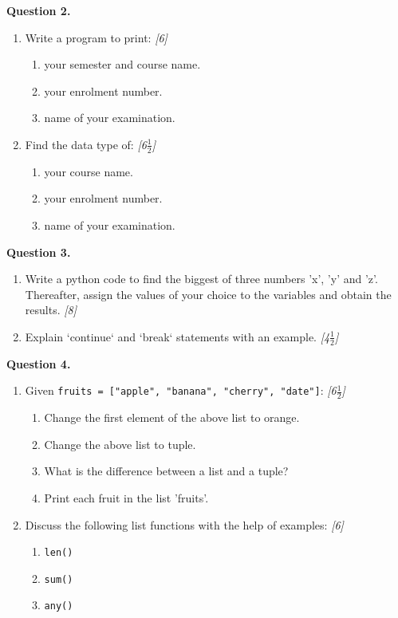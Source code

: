 \documentclass[11pt,a4paper]{article}
\newcommand{\pts}[1]{\hfill \textit{[#1]}}
\begin{document}
\noindent \textbf{Question 2.}
\begin{enumerate}[label=(\alph*)]
  \item Write a program to print: \pts{6}
  \begin{enumerate}[label=(\roman*)]
    \item your semester and course name.
    \item your enrolment number.
    \item name of your examination.
  \end{enumerate}
  \item Find the data type of: \pts{6$\frac{1}{2}$}
  \begin{enumerate}[label=(\roman*)]
    \item your course name.
    \item your enrolment number.
    \item name of your examination.
  \end{enumerate}
\end{enumerate}

\bigskip

\noindent \textbf{Question 3.}
\begin{enumerate}[label=(\alph*)]
  \item Write a python code to find the biggest of three numbers 'x', 'y' and 'z'. Thereafter, assign the values of your choice to the variables and obtain the results. \pts{8}
  \item Explain `continue` and `break` statements with an example. \pts{4$\frac{1}{2}$}
\end{enumerate}

\bigskip

\noindent \textbf{Question 4.}
\begin{enumerate}[label=(\alph*)]
  \item Given \texttt{fruits = ["apple", "banana", "cherry", "date"]}: \pts{6$\frac{1}{2}$}
  \begin{enumerate}[label=(\roman*)]
    \item Change the first element of the above list to orange.
    \item Change the above list to tuple.
    \item What is the difference between a list and a tuple?
    \item Print each fruit in the list 'fruits'.
  \end{enumerate}
  \item Discuss the following list functions with the help of examples: \pts{6}
  \begin{enumerate}[label=(\roman*)]
    \item \texttt{len()}
    \item \texttt{sum()}
    \item \texttt{any()}
  \end{enumerate}
\end{enumerate}
\end{document}
